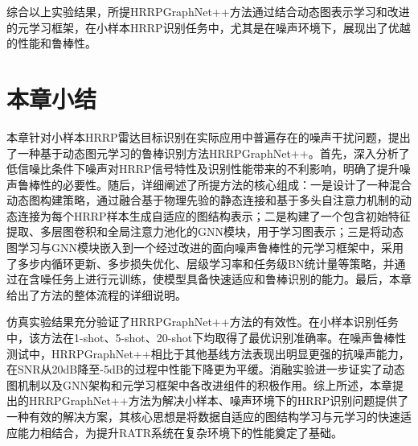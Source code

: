 综合以上实验结果，所提HRRPGraphNet++方法通过结合动态图表示学习和改进的元学习框架，在小样本HRRP识别任务中，尤其是在噪声环境下，展现出了优越的性能和鲁棒性。

\section{本章小结}
\label{sec:noise_summary}

本章针对小样本HRRP雷达目标识别在实际应用中普遍存在的噪声干扰问题，提出了一种基于动态图元学习的鲁棒识别方法HRRPGraphNet++。首先，深入分析了低信噪比条件下噪声对HRRP信号特性及识别性能带来的不利影响，明确了提升噪声鲁棒性的必要性。随后，详细阐述了所提方法的核心组成：一是设计了一种混合动态图构建策略，通过融合基于物理先验的静态连接和基于多头自注意力机制的动态连接为每个HRRP样本生成自适应的图结构表示；二是构建了一个包含初始特征提取、多层图卷积和全局注意力池化的GNN模块，用于学习图表示；三是将动态图学习与GNN模块嵌入到一个经过改进的面向噪声鲁棒性的元学习框架中，采用了多步内循环更新、多步损失优化、层级学习率和任务级BN统计量等策略，并通过在含噪任务上进行元训练，使模型具备快速适应和鲁棒识别的能力。最后，本章给出了方法的整体流程的详细说明。

仿真实验结果充分验证了HRRPGraphNet++方法的有效性。在小样本识别任务中，该方法在1-shot、5-shot、20-shot下均取得了最优识别准确率。在噪声鲁棒性测试中，HRRPGraphNet++相比于其他基线方法表现出明显更强的抗噪声能力，在SNR从20dB降至-5dB的过程中性能下降更为平缓。消融实验进一步证实了动态图机制以及GNN架构和元学习框架中各改进组件的积极作用。综上所述，本章提出的HRRPGraphNet++方法为解决小样本、噪声环境下的HRRP识别问题提供了一种有效的解决方案，其核心思想是将数据自适应的图结构学习与元学习的快速适应能力相结合，为提升RATR系统在复杂环境下的性能奠定了基础。
